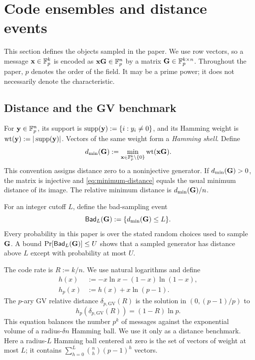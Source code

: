 \section{Code ensembles and distance events}
\label{sec:constructions}

This section defines the objects sampled in the paper.  We use row vectors,
so a message $\mathbf x\in\mathbb F_p^k$ is encoded as $\mathbf x\mathbf G\in\mathbb F_p^n$ by a matrix
$\mathbf G\in\mathbb F_p^{k\times n}$.
Throughout the paper, $p$ denotes the order of the field.  It may be a prime
power; it does not necessarily denote the characteristic.

\subsection{Distance and the GV benchmark}

For $\mathbf y\in\mathbb F_p^n$, its support is
$\operatorname{supp}(\mathbf y):=\{i:y_i\ne0\}$, and its Hamming weight is
$\operatorname{wt}(\mathbf y):=|\operatorname{supp}(\mathbf y)|$.  Vectors of the same weight form a \emph{Hamming
shell}.  Define
\begin{equation}
 d_{\min}(\mathbf G):=
 \min_{\mathbf x\in\mathbb F_p^k\setminus\{0\}}\operatorname{wt}(\mathbf x\mathbf G).
 \label{eq:minimum-distance}
\end{equation}
This convention assigns distance zero to a noninjective generator.  If
$d_{\min}(\mathbf G)>0$, the matrix is injective and
\eqref{eq:minimum-distance} equals the usual minimum distance of its image.
The relative minimum distance is $d_{\min}(\mathbf G)/n$.

For an integer cutoff $L$, define the bad-sampling event
\begin{equation}
 \mathsf{Bad}_L(\mathbf G):=\{d_{\min}(\mathbf G)\leq L\}.
 \label{eq:bad-event}
\end{equation}
Every probability in this paper is over the stated random choices used to
sample $\mathbf G$.  A bound $\Pr[\mathsf{Bad}_L(\mathbf G)]\leq U$ shows that a sampled generator
has distance above $L$ except with probability at most $U$.

The code rate is $R:=k/n$.  We use natural logarithms and define
\begin{align}
 h(x)&:=-x\ln x-(1-x)\ln(1-x),\label{eq:binary-entropy}\\
 h_p(x)&:=h(x)+x\ln(p-1).\label{eq:p-ary-entropy}
\end{align}
The $p$-ary GV relative distance $\delta_{p,\mathrm{GV}}(R)$ is the solution
in $(0,(p-1)/p)$ to
\begin{equation}
 h_p(\delta_{p,\mathrm{GV}}(R))=(1-R)\ln p.
 \label{eq:gv-definition}
\end{equation}
This equation balances the number $p^k$ of messages against the exponential
volume of a radius-$\delta n$ Hamming ball.  We use it only as a distance
benchmark.
Here a radius-$L$ Hamming ball centered at zero is the set of vectors of
weight at most $L$; it contains
$\sum_{h=0}^{L}\binom nh(p-1)^h$ vectors.

